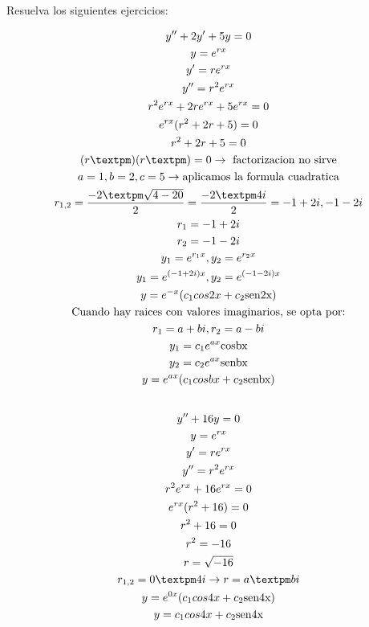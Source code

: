 \documentclass{article}
\begin{document}
Resuelva los siguientes ejercicios:


\begin{gather*}
y''+2y'+5y=0 \\
y = e^{rx} \\
y' =re^{rx} \\
y'' =r^{2}e^{rx} \\
r^{2}e^{rx}+2re^{rx}+5e^{rx}=0 \\
e^{rx}(r^{2}+2r+5) = 0 \\
r^{2}+2r+5 = 0 \\
(r±   )(r±   ) = 0  \rightarrow \text{ factorizacion no sirve} \\
a = 1, b=2, c=5 \rightarrow \text{aplicamos la formula cuadratica} \\
r_{1,2} = \frac{-2±\sqrt{4-20}}{2} =\frac{-2±4i}{2}= -1+2i,  -1-2i \\
r_{1} =-1+2i \\
r_{2} =-1-2i \\
y_{1} = e^{r_{1}x} ,  y_{2} = e^{r_{2}x} \\
y_{1} = e^{(-1+2i)x} ,  y_{2} = e^{(-1-2i)x} \\
y = e^{-x}(c_{1}cos2x+c_{2}\text{sen2x}) \\
\text{Cuando hay raices con valores imaginarios, se opta por:} \\
r_{1} = a+bi  ,  r_{2} = a-bi \\
y_{1} = c_{1}e^{ax}\text{cosbx} \\
y_{2}= c_{2}e^{ax}\text{senbx} \\
y = e^{ax}(c_{1}cosbx+c_{2}\text{senbx}) \\
\vspace{0.5em} \\
y''+16y =0 \\
y = e^{rx} \\
y' =re^{rx} \\
y'' =r^{2}e^{rx} \\
r^{2}e^{rx}+16 e^{rx} = 0 \\
e^{rx}(r^{2}+16) = 0 \\
r^{2}+16 = 0 \\
r^{2} = -16 \\
r = \sqrt{-16} \\
r_{1,2} =0 ±4i   \rightarrow      r = a±bi \\
y = e^{0x}(c_{1}cos4x+c_{2}\text{sen4x}) \\
y = c_{1}cos4x+c_{2}\text{sen4x} \\
\vspace{0.5em} \\

\end{gather*}
\end{document}
